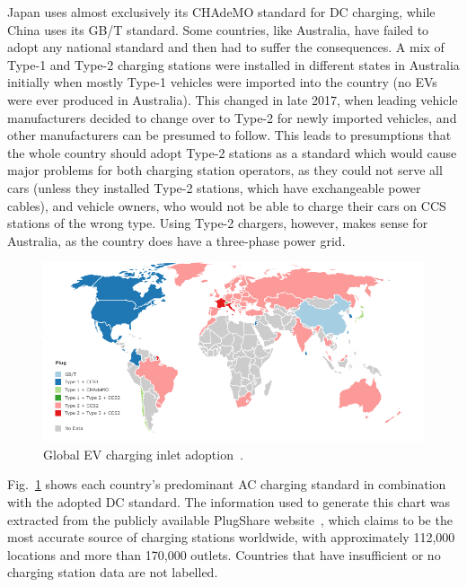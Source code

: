 Japan uses almost exclusively its CHAdeMO standard for DC charging, while China uses its GB/T standard. Some countries, like Australia, have failed to adopt any national standard and then had to suffer the consequences. A mix of Type-1 and Type-2 charging stations were installed in different states in Australia initially when mostly Type-1 vehicles were imported into the country (no EVs were ever produced in Australia). This changed in late 2017, when leading vehicle manufacturers decided to change over to Type-2 for newly imported vehicles, and other manufacturers can be presumed to follow. This leads to presumptions that the whole country should adopt Type-2 stations as a standard which would cause major problems for both charging station operators, as they could not serve all cars (unless they installed Type-2 stations, which have exchangeable power cables), and vehicle owners, who would not be able to charge their cars on CCS stations of the wrong type. Using Type-2 chargers, however, makes sense for Australia, as the country does have a three-phase power grid.

\begin{figure}[H]
	\centering
	\includegraphics[width=\linewidth]{map}
	\caption[Global EV charging inlet adoption]{Global EV charging inlet adoption~\cite{plugshare_plugshare_nodate}.}
	\label{fig:10:map}
\end{figure}

Fig.~\ref{fig:10:map} shows each country’s predominant AC charging standard in combination with the adopted DC standard. The information used to generate this chart was extracted from the publicly available PlugShare website~\cite{plugshare_plugshare_nodate}, which claims to be the most accurate source of charging stations worldwide, with approximately 112,000 locations and more than 170,000 outlets. Countries that have insufficient or no charging station data are not labelled. 

